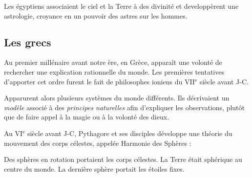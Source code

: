 Les égyptiens associaient le ciel et la Terre à des divinité et developpèrent une astrologie, croyance en un pouvoir des astres sur les hommes.

  \subsection{Les grecs}
Au premier millénaire avant notre ère, en Grèce, apparaît une volonté de rechercher une explication rationnelle du monde.
Les premières tentatives d'apporter cet ordre furent le fait de philosophes ioniens du {\footnotesize VII}$^\text{e}$ siècle avant J-C.

Apparurent alors plusieurs systèmes du monde différents. Ils décrivaient un {\it modèle} associé à des {\it principes naturelles} afin d'expliquer les observations, plutôt que de faire appel à la magie ou à la volonté des dieux. 

Au {\footnotesize VI}$^\text{e}$ siècle avant J-C, Pythagore et ses disciples développe une théorie du mouvement des corps célestes, appelée Harmonie des Sphères :

Des sphères en rotation portaient les corps célestes. La Terre était sphérique au centre du monde. La dernière sphère portait les étoiles fixes.





